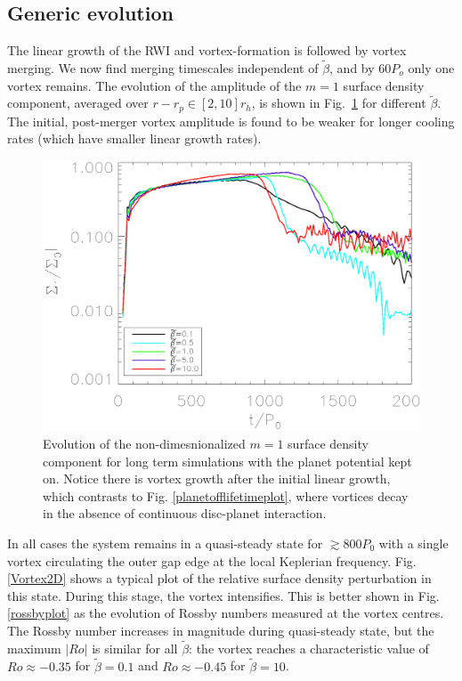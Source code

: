 \subsection{Generic evolution} 
The linear growth of the RWI and vortex-formation is followed by 
vortex merging. We now find merging timescales independent of
$\tilde\beta$, and by $60P_o$ only one vortex remains. 
The evolution of the amplitude of the $m=1$ surface density component,
averaged over $r-r_p\in[2,10]r_h$, is shown in Fig.~\ref{lifetimeplot} 
for different $\tilde\beta$. The initial, post-merger vortex amplitude
is found to be weaker for longer cooling rates (which have smaller 
linear growth rates). 

\begin{figure}
  \includegraphics[width=\linewidth,clip=true,trim=0.5cm
  0cm 0cm 1cm]{figures/longterm_stability}
  \caption{Evolution of the non-dimesnionalized $m=1$ surface density component
    for long term
    simulations with the planet potential kept on. Notice there is
    vortex growth after the initial linear growth, which
    contrasts to Fig. \ref{planetofflifetimeplot}, where vortices
    decay in the absence of continuous disc-planet interaction. 
    \label{lifetimeplot}}   
\end{figure}

In all cases the system remains in a quasi-steady state for
$\gtrsim800P_0$ with a single vortex circulating 
the outer gap edge at the local Keplerian  
frequency. 
Fig. \ref{Vortex2D} shows a typical plot of the relative 
surface density perturbation in this state. During this stage, the 
vortex intensifies. This is better shown in Fig. \ref{rossbyplot} as the
evolution of Rossby numbers measured at the vortex centres.  
The Rossby number increases in magnitude during quasi-steady state,
but the maximum $|Ro|$ is similar for all $\tilde{\beta}$: the vortex
reaches a characteristic value of $Ro\approx-0.35$ for 
$\tilde\beta=0.1$ and $Ro\approx -0.45$ for $\tilde\beta=10$.    

